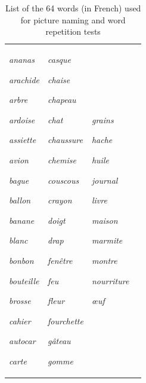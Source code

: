 \documentclass[output=paper,newtxmath,modfonts,nonflat,draftmode]{langsci/langscibook}
\begin{document}
\begin{table}
\caption{ List of the 64 words (in French) used for picture naming and word repetition tests }

\begin{tabularx}{\textwidth}{XXXX}
\textit{ananas}

\textit{arachide}

\textit{arbre~}

\textit{ardoise}

\textit{assiette} 

\textit{avion} 

\textit{bague}

\textit{ballon}

\textit{banane}

\textit{blanc} 

\textit{bonbon~}

\textit{bouteille}

\textit{brosse} 

\textit{cahier}

\textit{autocar}

\textit{carte} & \textit{casque} 

\textit{chaise}

\textit{chapeau}

\textit{chat}

\textit{chaussure}

\textit{chemise}

\textit{couscous}

\textit{crayon}

\textit{doigt}

\textit{drap} 

\textit{fenêtre} 

\textit{feu}

\textit{fleur} 

\textit{fourchette}

\textit{gâteau}

\textit{gomme} & \textit{grains} 

\textit{hache}

\textit{huile}

\textit{journal}

\textit{livre} 

\textit{maison}

\textit{marmite}

\textit{montre} 

\textit{nourriture}

\textit{œuf}


\end{tabularx}
\end{table}
\end{document}
